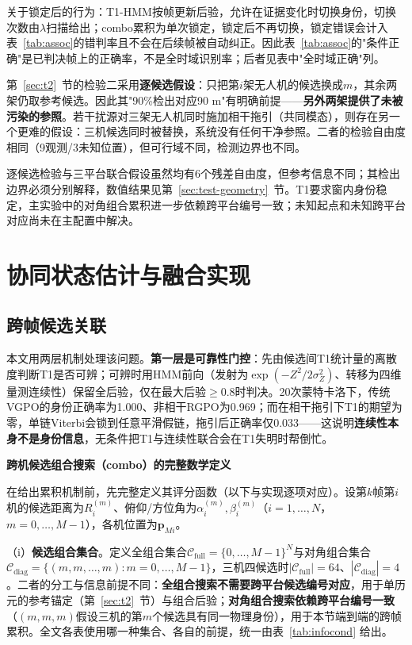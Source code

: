 \documentclass[UTF8,a4paper,zihao=-4]{ctexart}
\begin{document}
关于锁定后的行为：T1-HMM按帧更新后验，允许在证据变化时切换身份，切换次数由\(\lambda\)扫描给出；combo累积为单次锁定，锁定后不再切换，锁定错误会计入表~\ref{tab:assoc}的错判率且不会在后续帧被自动纠正。因此表~\ref{tab:assoc}的"条件正确"是已判决帧上的正确率，不是全时域识别率；后者见表中"全时域正确"列。

第~\ref{sec:t2}~节的检验二采用\textbf{逐候选假设}：只把第\(i\)架无人机的候选换成\(m\)，其余两架仍取参考候选。因此其"90\%检出对应90 m"有明确前提——\textbf{另外两架提供了未被污染的参照}。若干扰源对三架无人机同时施加相干拖引（共同模态），则存在另一个更难的假设：三机候选同时被替换，系统没有任何干净参照。二者的检验自由度相同（9观测/3未知位置），但可行域不同，检测边界也不同。

逐候选检验与三平台联合假设虽然均有6个残差自由度，但参考信息不同；其检出边界必须分别解释，数值结果见第~\ref{sec:test-geometry}~节。T1要求窗内身份稳定，主实验中的对角组合累积进一步依赖跨平台编号一致；未知起点和未知跨平台对应尚未在主配置中解决。


\section{协同状态估计与融合实现}\label{sec:algorithm}


\subsection{跨帧候选关联}\label{sec:association}
本文用两层机制处理该问题。\textbf{第一层是可靠性门控}：先由候选间T1统计量的离散度判断T1是否可辨；可辨时用HMM前向（发射为\(\exp(-Z^2/2\sigma_Z^2)\)、转移为四维量测连续性）保留全后验，仅在最大后验\(\ge0.8\)时判决。20次蒙特卡洛下，传统VGPO的身份正确率为1.000、非相干RGPO为0.969；而在相干拖引下T1的期望为零，单链Viterbi会锁到任意平滑假链，拖引后正确率仅0.033——这说明\textbf{连续性本身不是身份信息}，无条件把T1与连续性联合会在T1失明时帮倒忙。

\textbf{跨机候选组合搜索（combo）的完整数学定义}\par

在给出累积机制前，先完整定义其评分函数（以下与实现逐项对应）。设第\(k\)帧第\(i\)机的候选距离为\(R_i^{(m)}\)、俯仰/方位角为\(\alpha_i^{(m)},\beta_i^{(m)}\)（\(i=1,\dots,N\)，\(m=0,\dots,M-1\)），各机位置为\(\boldsymbol p_{M i}\)。

（i）\textbf{候选组合集合}。定义全组合集合\(\mathcal C_{\mathrm{full}}=\{0,\dots,M-1\}^{N}\)与对角组合集合\(\mathcal C_{\mathrm{diag}}=\{(m,m,\dots,m):m=0,\dots,M-1\}\)，三机四候选时\(|\mathcal C_{\mathrm{full}}|=64\)、\(|\mathcal C_{\mathrm{diag}}|=4\)。二者的分工与信息前提不同：\textbf{全组合搜索不需要跨平台候选编号对应}，用于单历元的参考锚定（第~\ref{sec:t2}~节）与组合后验；\textbf{对角组合搜索依赖跨平台编号一致}（\((m,m,m)\)假设三机的第\(m\)个候选具有同一物理身份），用于本节端到端的跨帧累积。全文各表使用哪一种集合、各自的前提，统一由表~\ref{tab:infocond} 给出。
\end{document}
